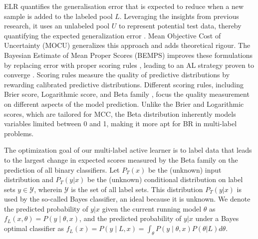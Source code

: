 \documentclass[letterpaper]{article} %
\begin{document}
ELR \citep{roy2001toward} quantifies the generalisation error that is expected to reduce when a new sample is added to the labeled pool $L$. 
Leveraging the insights from previous research, it uses an unlabeled pool $U$ to represent potential test data, thereby quantifying the expected generalization error \citep{settles2009active}. 
Mean Objective Cost of Uncertainty (MOCU) \cite{zhao2020uncertainty} generalizes this approach and adds theoretical rigour.
The Bayesian Estimate of Mean Proper Scores (BEMPS) improves these formulations by replacing error with proper scoring rules \citep{doi:10.1198/016214506000001437}, leading to an AL strategy proven to converge  \citep{TanDuBun-IEEEPAMI23}.  
Scoring rules measure the quality of predictive distributions by rewarding calibrated predictive distributions.
Different scoring rules, including Brier score,
Logarithmic score, and Beta family \cite{doi:10.1198/016214506000001437},
focus the quality measurement on different aspects of the model prediction.
Unlike the Brier and Logarithmic scores, which are tailored for MCC, the Beta distribution inherently models variables limited between 0 and 1, making it more apt for BR in multi-label problems. 

The optimization goal of our multi-label active learner is to
label data that
leads to the largest change in expected scores
measured by the Beta family on the prediction of all binary classifiers. 
Let $P_T(x)$ be the (unknown) input distribution and
$P_T(y|x)$ be the (unknown) conditional distribution on label sets
$y\in \mathcal{Y}$, wherein $\mathcal{Y}$ is the set of all label sets.
This distribution $P_T(y|x)$ is used by the so-called Bayes classifier, an ideal because it is unknown.
We denote the predicted probability of $y|x$ given the current running model $\theta$ as $f_L(x,\theta)=P(y \mid \theta,x)$, 
and 
the predicted probability of $y|x$ under a Bayes optimal classifier
as $f_{L}(x)=P(y\mid L,x)=\int_\theta P(y \mid \theta,x) P(\theta|L) d\theta$. 
\end{document}
